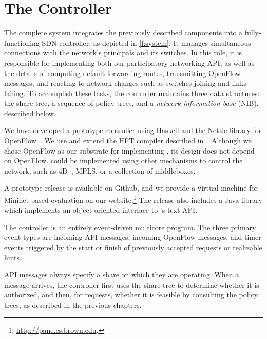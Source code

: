 \chapter{The \sys Controller}
\label{sec:FullSystem}



The complete \sys system integrates the previously described
components into a fully-functioning SDN controller, as depicted in
\autoref{f:system}.  It manages simultaneous connections with the
network's principals and its switches. In this role, it is
responsible for implementing both our participatory networking API,
as well as the details of computing default forwarding routes,
transmitting OpenFlow messages, and reacting to network changes such
as switches joining and links failing.  To accomplish these tasks,
the \sys controller maintains three data structures: the share tree,
a sequence of policy trees, and a \emph{network information base}
(NIB), described below.

We have developed a prototype \sys controller using Haskell and the
Nettle library for OpenFlow~\cite{Voellmy:2011}. We use and extend
the HFT compiler described in~\cite{Ferguson:2012b}.  Although
we chose OpenFlow as our substrate for implementing \sys, its design
does not depend on OpenFlow. \sys could be implemented using other
mechanisms to control the network, such as 4D~\cite{Greenberg:2005},
MPLS, or a collection of middleboxes.

A prototype release is available on Github, and we provide a virtual
machine for Mininet-based evaluation on our website.\footnote{\url{http://pane.cs.brown.edu}.} The release also includes a Java library
which implements an object-oriented interface to \sys's text API.

The \sys controller is an entirely event-driven multicore program.
The three primary event types are incoming \sys API messages,
incoming OpenFlow messages, and timer events triggered by the start
or finish of previously accepted requests or realizable hints.

API messages always specify a share on which they
are operating. When a message arrives, the \sys controller first
uses the share tree to determine whether it is authorized, and then,
for requests, whether it is feasible by consulting the policy
trees, as described in the previous chapters.

